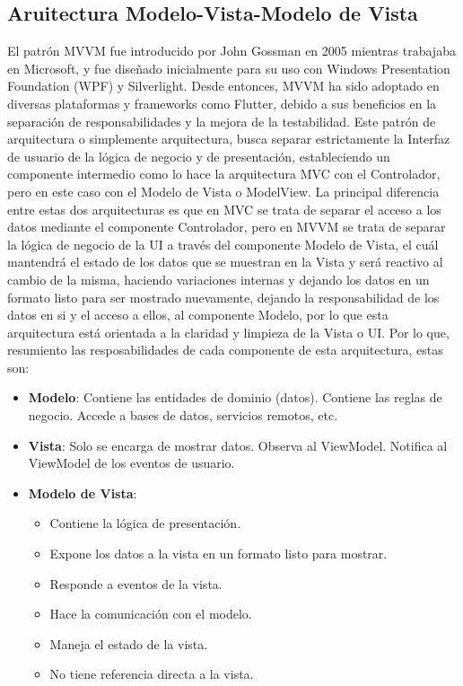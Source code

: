 \subsection{Aruitectura Modelo-Vista-Modelo de Vista}
El patrón MVVM fue introducido por John Gossman en 2005 mientras trabajaba en Microsoft, y fue diseñado inicialmente para su uso
con Windows Presentation Foundation (WPF) y Silverlight. Desde entonces, MVVM ha sido adoptado en diversas plataformas y frameworks como Flutter,
debido a sus beneficios en la separación de responsabilidades y la mejora de la testabilidad.
Este patrón de arquitectura o simplemente arquitectura, busca separar estrictamente la Interfaz de usuario de la lógica de negocio y de presentación, estableciendo un componente
intermedio como lo hace la arquitectura MVC con el Controlador, pero en este caso con el Modelo de Vista o ModelView. La principal diferencia entre estas dos arquitecturas
es que en MVC se trata de separar el acceso a los datos mediante el componente Controlador, pero en MVVM se trata de separar la lógica de negocio de la UI a través del componente
Modelo de Vista, el cuál mantendrá el estado de los datos que se muestran en la Vista y será reactivo al cambio de la misma, haciendo variaciones internas y dejando los datos en
un formato listo para ser mostrado nuevamente, dejando la responsabilidad de los datos en si y el acceso a ellos, al componente Modelo, por lo que esta arquitectura está orientada
a la claridad y limpieza de la Vista o UI. Por lo que, resumiento las resposabilidades de cada componente de esta arquitectura, estas son:

\begin{itemize}
    \item \textbf{Modelo}: Contiene las entidades de dominio (datos). Contiene las reglas de negocio. Accede a bases de datos, servicios remotos, etc.
    \item \textbf{Vista}: Solo se encarga de mostrar datos. Observa al ViewModel. Notifica al ViewModel de los eventos de usuario.
    \item \textbf{Modelo de Vista}:
          \begin{itemize}
              \item Contiene la lógica de presentación.
              \item Expone los datos a la vista en un formato listo para mostrar.
              \item Responde a eventos de la vista.
              \item Hace la comunicación con el modelo.
              \item Maneja el estado de la vista.
              \item No tiene referencia directa a la vista.
          \end{itemize}

\end{itemize}
